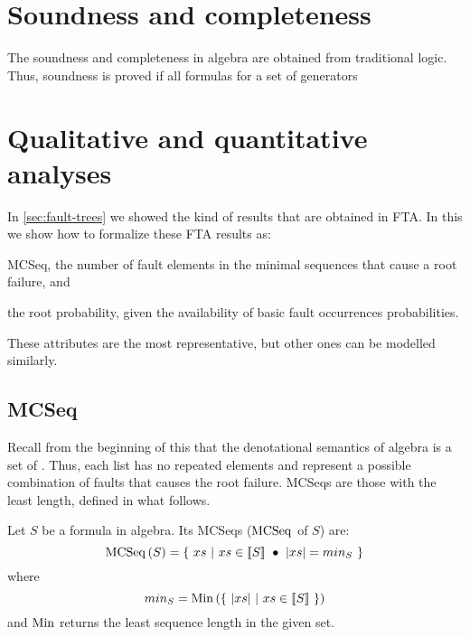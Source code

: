 \section{Soundness and completeness}
\label{sec:algebras-soundness-and-completeness}

The soundness and completeness in \ac{algebra} are obtained from traditional logic.
Thus, soundness is proved if all formulas for a set of generators 

\section{Qualitative and quantitative analyses}
\label{sec:qualitative-quantitative-analyses}

In \cref{sec:fault-trees} we showed the kind of results that are obtained in \ac{FTA}.
In this  we show how to formalize these \ac{FTA} results as: 
\begin{alineasinline}
  \item \ac{MCSeq}, the number of fault elements in the minimal sequences that cause a root failure, and 
  \item the root probability, given the availability of basic fault occurrences probabilities.
\end{alineasinline}
%
These attributes are the most representative, but other ones can be modelled similarly.

\subsection{\Acl{MCSeq}}

Recall from the beginning of this  that the denotational semantics of \ac{algebra} is a set of \distinctlists.
Thus, each list has no repeated elements and represent a possible combination of faults that causes the root failure.
\Acp{MCSeq} are those \distinctlists with the least length, defined in what follows.

\begin{definition}
Let $S$ be a formula in \ac{algebra}.
Its \aclp{MCSeq} ($\operatorname{\mathrm{MCSeq}}$ of $S$) are:
%
\begin{equation}
\operatorname{\mathrm{MCSeq}}\left(S\right) = \left\{~ xs ~\middle|~ xs \in \left[\!\left[S\right]\!\right] ~\bullet~ \left|xs\right| = min_S ~\right\}
\end{equation}
%
where
\[
min_S = \mathrm{Min}\left(\left\{~ \left|xs\right| ~\middle|~ xs \in \left[\!\left[S\right]\!\right] ~\right\}\right)
\]
%
and $\mathrm{Min}$ returns the least sequence length in the given set.
\end{definition}

